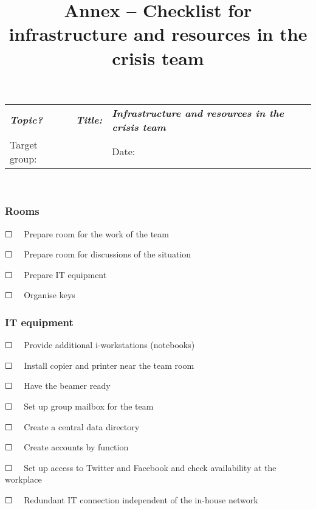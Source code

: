 \documentclass{article}
\begin{document}
\title{Annex – Checklist for infrastructure and resources in the crisis team}

\maketitle





\begin{tabu} to \textwidth { |X|X|X| }
\hline



\emph{\textbf{Topic?}} & \emph{\textbf{Title:}} & \emph{\textbf{Infrastructure and resources in the crisis team}}
 \\


Target group:  &  & Date:
 \\
\hline

\end{tabu}

                                                         


\subsubsection{Rooms}\label{H4260866}



☐   Prepare room for the work of the team


☐   Prepare room for discussions of the situation


☐   Prepare IT equipment


☐   Organise keys


\subsubsection{IT equipment}\label{H5650686}



☐   Provide additional i-workstations (notebooks)


☐   Install copier and printer near the team room


☐   Have the beamer ready


☐   Set up group mailbox for the team


☐   Create a central data directory


☐   Create accounts by function


☐   Set up access to Twitter and Facebook and check availability at the workplace


☐   Redundant IT connection independent of the in-house network
\end{document}

